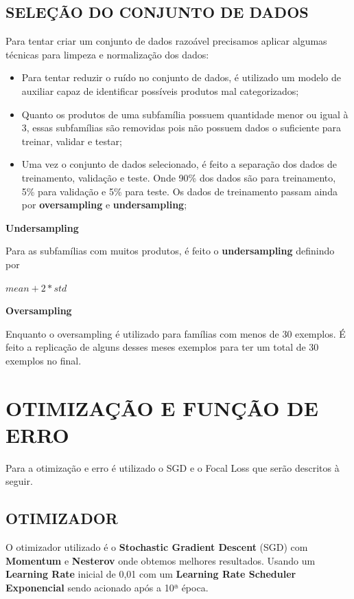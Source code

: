 \subsection{SELEÇÃO DO CONJUNTO DE DADOS}

Para tentar criar um conjunto de dados razoável precisamos aplicar algumas técnicas para limpeza e normalização dos dados:

\begin{itemize}
\item Para tentar reduzir o ruído no conjunto de dados, é utilizado um modelo de auxiliar capaz de identificar possíveis produtos mal categorizados;
\item Quanto os produtos de uma subfamília possuem quantidade menor ou igual à 3, essas subfamílias são removidas pois não possuem dados o suficiente para treinar, validar e testar;
\item Uma vez o conjunto de dados selecionado, é feito a separação dos dados de treinamento, validação e teste. Onde 90\% dos dados são para treinamento, 5\% para validação e 5\% para teste. Os dados de treinamento passam ainda por \textbf{oversampling} e \textbf{undersampling};
\end{itemize}

\textbf{Undersampling}

Para as subfamílias com muitos produtos, é feito o \textbf{undersampling} definindo por

\begin{center}
    $mean + 2 * std$
\end{center}

\textbf{Oversampling}

Enquanto o oversampling é utilizado para famílias com menos de 30 exemplos. É feito a replicação de alguns desses meses exemplos para ter um total de 30 exemplos no final.

\section{OTIMIZAÇÃO E FUNÇÃO DE ERRO}

Para a otimização e erro é utilizado o SGD e o Focal Loss que serão descritos à seguir.

\subsection{OTIMIZADOR}

O otimizador utilizado é o \textbf{Stochastic Gradient Descent} (SGD) com \textbf{Momentum} e \textbf{Nesterov} onde obtemos melhores resultados. Usando um \textbf{Learning Rate} inicial de 0,01 com um \textbf{Learning Rate Scheduler Exponencial} sendo acionado após a 10ª época.

